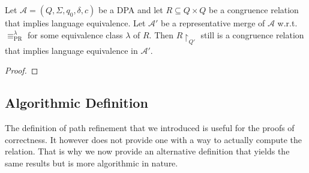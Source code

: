 \begin{lem}
	Let $\mathcal{A} = (Q, \Sigma, q_0, \delta, c)$ be a DPA and let $R \subseteq Q \times Q$ be a congruence relation that implies language equivalence. Let $\mathcal{A}'$ be a representative merge of $\mathcal{A}$ w.r.t. $\equiv_\text{PR}^\lambda$ for some equivalence class $\lambda$ of $R$. Then $R \upharpoonright_{Q'}$ still is a congruence relation that implies language equivalence in $\mathcal{A}'$.
\end{lem}

\begin{proof}
\end{proof}


\subsection{Algorithmic Definition}
The definition of path refinement that we introduced is useful for the proofs of correctness. It however does not provide one with a way to actually compute the relation. That is why we now provide an alternative definition that yields the same results but is more algorithmic in nature.

